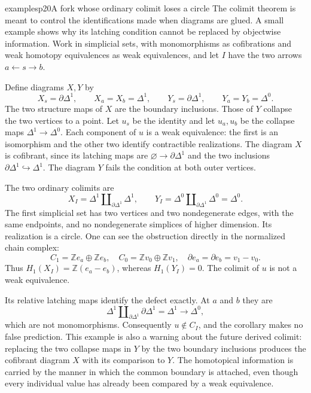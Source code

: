 \begin{dcomment}{examples}{p20}{A fork whose ordinary colimit loses a circle}
The colimit theorem is meant to control the identifications made when diagrams are glued. A small example shows why its latching condition cannot be replaced by objectwise information. Work in simplicial sets, with monomorphisms as cofibrations and weak homotopy equivalences as weak equivalences, and let $I$ have the two arrows $a\leftarrow s\to b$.

Define diagrams $X,Y$ by
\[
 X_s=\partial\Delta^1,\qquad X_a=X_b=\Delta^1,
 \qquad
 Y_s=\partial\Delta^1,\qquad Y_a=Y_b=\Delta^0.
\]
The two structure maps of $X$ are the boundary inclusions. Those of $Y$ collapse the two vertices to a point. Let $u_s$ be the identity and let $u_a,u_b$ be the collapse maps $\Delta^1\to\Delta^0$. Each component of $u$ is a weak equivalence: the first is an isomorphism and the other two identify contractible realizations. The diagram $X$ is cofibrant, since its latching maps are $\varnothing\to\partial\Delta^1$ and the two inclusions $\partial\Delta^1\hookrightarrow\Delta^1$. The diagram $Y$ fails the condition at both outer vertices.

The two ordinary colimits are
\[
 X_I=\Delta^1\amalg_{\partial\Delta^1}\Delta^1,
 \qquad
 Y_I=\Delta^0\amalg_{\partial\Delta^1}\Delta^0=\Delta^0.
\]
The first simplicial set has two vertices and two nondegenerate edges, with the same endpoints, and no nondegenerate simplices of higher dimension. Its realization is a circle. One can see the obstruction directly in the normalized chain complex:
\[
 C_1=\mathbb Z e_a\oplus\mathbb Z e_b,
 \quad C_0=\mathbb Z v_0\oplus\mathbb Z v_1,
 \quad \partial e_a=\partial e_b=v_1-v_0.
\]
Thus $H_1(X_I)=\mathbb Z(e_a-e_b)$, whereas $H_1(Y_I)=0$. The colimit of $u$ is not a weak equivalence.

Its relative latching maps identify the defect exactly. At $a$ and $b$ they are
\[
 \Delta^1\amalg_{\partial\Delta^1}\partial\Delta^1
       =\Delta^1\longrightarrow\Delta^0,
\]
which are not monomorphisms. Consequently $u\notin C_I$, and the corollary makes no false prediction. This example is also a warning about the future derived colimit: replacing the two collapse maps in $Y$ by the two boundary inclusions produces the cofibrant diagram $X$ with its comparison to $Y$. The homotopical information is carried by the manner in which the common boundary is attached, even though every individual value has already been compared by a weak equivalence.
\end{dcomment}

